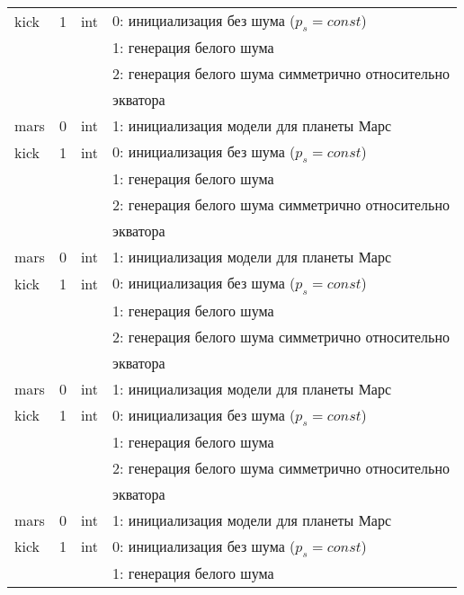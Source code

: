 \begin{longtable}[c]{|l|c|l|l|}
    kick     & 1      & int & 0: инициализация без шума (\(p_s = const\))       \\
             &        &     & 1: генерация белого шума                          \\
             &        &     & 2: генерация белого шума симметрично относительно \\
             &        &     & экватора                                          \\
    mars     & 0      & int & 1: инициализация модели для планеты Марс          \\
    kick     & 1      & int & 0: инициализация без шума (\(p_s = const\))       \\
             &        &     & 1: генерация белого шума                          \\
             &        &     & 2: генерация белого шума симметрично относительно \\
             &        &     & экватора                                          \\
    mars     & 0      & int & 1: инициализация модели для планеты Марс          \\
    kick     & 1      & int & 0: инициализация без шума (\(p_s = const\))       \\
             &        &     & 1: генерация белого шума                          \\
             &        &     & 2: генерация белого шума симметрично относительно \\
             &        &     & экватора                                          \\
    mars     & 0      & int & 1: инициализация модели для планеты Марс          \\
    kick     & 1      & int & 0: инициализация без шума (\(p_s = const\))       \\
             &        &     & 1: генерация белого шума                          \\
             &        &     & 2: генерация белого шума симметрично относительно \\
             &        &     & экватора                                          \\
    mars     & 0      & int & 1: инициализация модели для планеты Марс          \\
    kick     & 1      & int & 0: инициализация без шума (\(p_s = const\))       \\
             &        &     & 1: генерация белого шума                          \\

\end{longtable}
